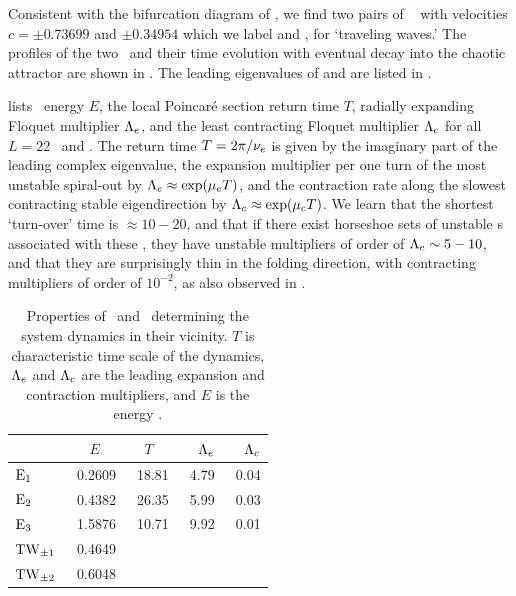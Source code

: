 Consistent with the bifurcation diagram of ,
we find two pairs of \reqva\  with velocities
$c =\pm 0.73699$ and $\pm 0.34954$
which we label  and ,
for `traveling waves.'
The profiles of the two \reqva\ and their time evolution
with eventual decay into the chaotic attractor are
shown in .  The leading eigenvalues of
 and  are listed in .

 lists \eqv\ energy $E$,
the local Poincar\'e section return time $T$,
radially expanding Floquet multiplier $\ExpaEig_e$, and
the least contracting Floquet multiplier $\ExpaEig_c$
for all $L=22$ \eqva\ and \reqva.
The return time $T=2\pi/\eigIm[e]$ is given by the imaginary
part of the leading complex eigenvalue,
the expansion
multiplier per one turn of the most unstable spiral-out by
$\ExpaEig_e\approx\exp(\eigRe[e] T)$, and the contraction
rate along the slowest contracting stable eigendirection by
$\ExpaEig_c\approx\exp(\eigRe[c]T)$. We learn that the shortest
`turn-over' time is $\approx 10-20$, and that if there exist
horseshoe sets of unstable \po s associated with
these \eqva,  they have unstable
multipliers of order of $\ExpaEig_e \sim 5-10$, and that
they are surprisingly thin in the folding direction, with
contracting multipliers of order of $10^{-2}$,
as also observed in .

\begin{table}[ht]
    \caption{
    Properties of \eqva\ and \reqva\ determining
    the system dynamics in their vicinity.  $T$ is characteristic
    time scale of the dynamics, $\ExpaEig_e$ and $\ExpaEig_c$ are the
    leading expansion and contraction multipliers, and $E$ is the
    energy .
            }
\begin{center} \footnotesize
    \begin{tabular}{l|rrrr}
                 & $E$~~   & $T$~~  & $\ExpaEig_e$  & $\ExpaEig_c$  \\ \hline
 $\EQV{1}\ $     &\ 0.2609 &\ 18.81 &\ 4.79     &\ 0.04 \\
 $\EQV{2}\ $     &\ 0.4382 &\ 26.35 &\ 5.99     &\ 0.03 \\
 $\EQV{3}\ $     &\ 1.5876 &\ 10.71 &\ 9.92     &\ 0.01 \\
 $\REQV{\pm}{1}$ &\ 0.4649 &  &  & \\
 $\REQV{\pm}{2}$ &\ 0.6048 &  &  & \\
    \end{tabular}
\end{center}
\label{tab:L22cminus}
\end{table}

